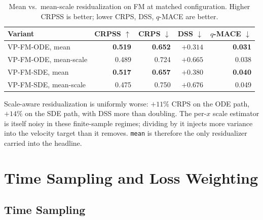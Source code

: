 \documentclass{tpm2026}
\begin{document}
\begin{table}[!h]
  \centering
  \caption{Mean vs.\ mean-scale residualization on FM at matched configuration. Higher CRPSS is better; lower CRPS, DSS, $q$-MACE are better.}\label{tab:mean-scale}
  \footnotesize
  \begin{tabular}{lrrrr}
    \toprule
    Variant & CRPSS $\uparrow$ & CRPS $\downarrow$ & DSS $\downarrow$ & $q$-MACE $\downarrow$ \\
    \midrule
    VP-FM-ODE, mean       & \textbf{0.519} & \textbf{0.652} & \textbf{$+0.314$} & \textbf{0.031} \\
    VP-FM-ODE, mean-scale & 0.489 & 0.724 & $+0.665$ & 0.038 \\
    VP-FM-SDE, mean       & \textbf{0.517} & \textbf{0.657} & \textbf{$+0.380$} & \textbf{0.040} \\
    VP-FM-SDE, mean-scale & 0.475 & 0.750 & $+0.676$ & 0.049 \\
    \bottomrule
  \end{tabular}
\end{table}

Scale-aware residualization is uniformly worse: $+11\%$ CRPS on the ODE path, $+14\%$ on the SDE path, with DSS more than doubling. The per-$x$ scale estimator is itself noisy in these finite-sample regimes; dividing by it injects more variance into the velocity target than it removes. \texttt{mean} is therefore the only residualizer carried into the headline.

\section{Time Sampling and Loss Weighting}\label{app:t-and-loss}

\subsection{Time Sampling}\label{app:t-sampling}
\end{document}
